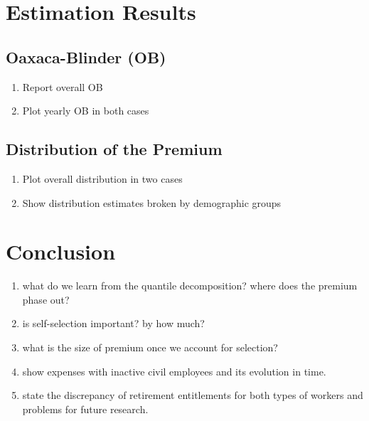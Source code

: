 \documentclass{article}
\begin{document}
\section{Estimation Results}
\subsection{Oaxaca-Blinder (OB)}
\begin{enumerate}
    \item Report overall OB 
    \item Plot yearly OB in both cases
\end{enumerate}
\subsection{Distribution of the Premium}
\begin{enumerate}
    \item Plot overall distribution in two cases
    \item Show distribution estimates broken by demographic groups
\end{enumerate}

\section{Conclusion}
 \begin{enumerate}
     \item what do we learn from the quantile decomposition? where does the premium phase out?
     \item is self-selection important? by how much?
     \item what is the size of premium once we account for selection?
     \item show expenses with inactive civil employees and its evolution in time.
     \item state the discrepancy of retirement entitlements for both types of workers and problems for future research. 
\end{enumerate}  

\newpage
\scriptsize{}
\end{document}
